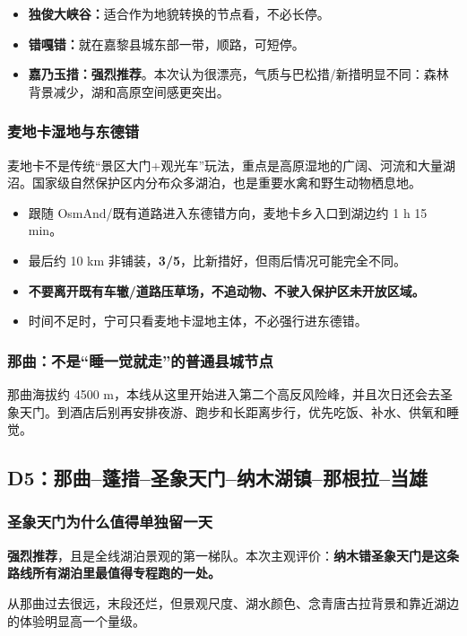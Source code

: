 \documentclass[10.5pt,a4paper]{ctexart}
\newcommand{\tagmust}{\textcolor{green!40!black}{\textbf{强烈推荐}}}
\newcommand{\grade}[1]{\textbf{#1/5}}
\begin{document}
\begin{itemize}
  \item \textbf{独俊大峡谷：}适合作为地貌转换的节点看，不必长停。
  \item \textbf{错嘎错：}就在嘉黎县城东部一带，顺路，可短停。
  \item \textbf{嘉乃玉措：}\tagmust。本次认为很漂亮，气质与巴松措/新措明显不同：森林背景减少，湖和高原空间感更突出。
\end{itemize}

\subsubsection{麦地卡湿地与东德错}
麦地卡不是传统“景区大门+观光车”玩法，重点是高原湿地的广阔、河流和大量湖沼。国家级自然保护区内分布众多湖泊，也是重要水禽和野生动物栖息地。

\begin{itemize}
  \item 跟随 OsmAnd/既有道路进入东德错方向，麦地卡乡入口到湖边约 1 h 15 min。
  \item 最后约 10 km 非铺装，\grade{3}，比新措好，但雨后情况可能完全不同。
  \item \textbf{不要离开既有车辙/道路压草场，不追动物、不驶入保护区未开放区域。}
  \item 时间不足时，宁可只看麦地卡湿地主体，不必强行进东德错。
\end{itemize}

\subsubsection{那曲：不是“睡一觉就走”的普通县城节点}
那曲海拔约 4500 m，本线从这里开始进入第二个高反风险峰，并且次日还会去圣象天门。到酒店后别再安排夜游、跑步和长距离步行，优先吃饭、补水、供氧和睡觉。

\subsection{D5：那曲--蓬措--圣象天门--纳木湖镇--那根拉--当雄}

\subsubsection{圣象天门为什么值得单独留一天}
\tagmust，且是全线湖泊景观的第一梯队。本次主观评价：\textbf{纳木错圣象天门是这条路线所有湖泊里最值得专程跑的一处。}

从那曲过去很远，末段还烂，但景观尺度、湖水颜色、念青唐古拉背景和靠近湖边的体验明显高一个量级。
\end{document}
